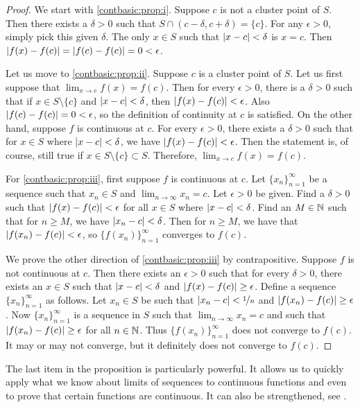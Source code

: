 \begin{proof}
We start with \eqref{contbasic:prop:i}.  Suppose $c$ is not a cluster point of
$S$.  Then there exists a $\delta > 0$
such that $S \cap (c-\delta,c+\delta) = \{ c \}$.
For any $\epsilon > 0$, simply pick this given $\delta$.
The only $x \in S$ such that $\left\lvert {x-c} \right\rvert < \delta$ is $x=c$.  Then
$\left\lvert {f(x)-f(c)} \right\rvert = \left\lvert {f(c)-f(c)} \right\rvert = 0 < \epsilon$.

Let us move to \eqref{contbasic:prop:ii}.
Suppose $c$ is a cluster point of $S$.  Let us first suppose
that $\lim_{x\to c} f(x) = f(c)$.  Then for every $\epsilon > 0$,
there is a $\delta > 0$ such that if $x \in S \setminus \{ c \}$
and $\left\lvert {x-c} \right\rvert < \delta$, then $\left\lvert {f(x)-f(c)} \right\rvert < \epsilon$.
Also $\left\lvert {f(c)-f(c)} \right\rvert = 0 < \epsilon$, so the definition of continuity at
$c$ is satisfied.  On the other hand, suppose $f$ is continuous
at $c$.  For every $\epsilon > 0$, there exists a $\delta > 0$
such that for $x \in S$ where $\left\lvert {x-c} \right\rvert < \delta$, we have
$\left\lvert {f(x)-f(c)} \right\rvert < \epsilon$.  Then the statement is, of course, still true if
$x \in S \setminus \{ c \} \subset S$.  Therefore, $\lim_{x\to c} f(x) =
f(c)$.

For \eqref{contbasic:prop:iii}, first suppose $f$ is continuous at $c$.
Let $\{ x_n \}_{n=1}^\infty$
be a sequence such that $x_n \in S$ and $\lim_{n\to\infty} x_n = c$.  Let $\epsilon > 0$
be given.  Find a $\delta > 0$ such that $\left\lvert {f(x)-f(c)} \right\rvert < \epsilon$
for all $x \in S$ where $\left\lvert {x-c} \right\rvert < \delta$.  Find an $M \in {\mathbb{N}}$
such that for $n \geq M$, we have $\left\lvert {x_n-c} \right\rvert < \delta$.  Then for
$n \geq M$, we have that $\left\lvert {f(x_n)-f(c)} \right\rvert < \epsilon$,
so $\bigl\{ f(x_n) \bigr\}_{n=1}^\infty$
converges to $f(c)$.

We prove the other direction of \eqref{contbasic:prop:iii} by contrapositive.
Suppose $f$ is not
continuous at $c$.  Then there exists an $\epsilon > 0$
such that for every $\delta > 0$, there exists an $x \in S$
such that $\left\lvert {x-c} \right\rvert < \delta$ and $\left\lvert {f(x)-f(c)} \right\rvert \geq \epsilon$.
Define a sequence $\{ x_n \}_{n=1}^\infty$ as follows.
Let $x_n \in S$ be such that $\left\lvert {x_n-c} \right\rvert < \nicefrac{1}{n}$
and $\left\lvert {f(x_n)-f(c)} \right\rvert \geq \epsilon$.
Now $\{ x_n \}_{n=1}^\infty$ is
a sequence in $S$ such that
$\lim_{n\to\infty} x_n = c$ and such that
$\left\lvert {f(x_n)-f(c)} \right\rvert \geq \epsilon$ for all $n \in {\mathbb{N}}$.
Thus $\bigl\{ f(x_n) \bigr\}_{n=1}^\infty$
does not converge to $f(c)$.  It may or may not converge, but it definitely
does not converge to $f(c)$.  
\end{proof}

The last item in the proposition is particularly powerful.  It allows us to
quickly apply what we know about limits of sequences to continuous functions
and even to prove that certain functions are continuous.
It can also be strengthened, see .

